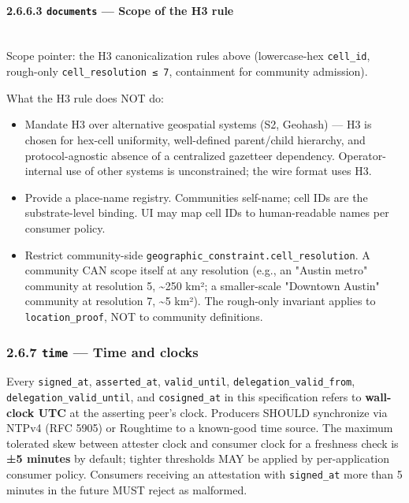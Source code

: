 \documentclass[11pt]{article}
\begin{document}
\paragraph{2.6.6.3 \texttt{documents} — Scope of the H3 rule}\mbox{}\\


Scope pointer: the H3 canonicalization rules above (lowercase-hex \texttt{cell\_id}, rough-only \texttt{cell\_resolution ≤ 7}, containment for community admission).


What the H3 rule does NOT do:

\begin{itemize}\setlength\itemsep{0pt}
\item Mandate H3 over alternative geospatial systems (S2, Geohash) — H3 is chosen for hex-cell uniformity, well-defined parent/child hierarchy, and protocol-agnostic absence of a centralized gazetteer dependency. Operator-internal use of other systems is unconstrained; the wire format uses H3.
\item Provide a place-name registry. Communities self-name; cell IDs are the substrate-level binding. UI may map cell IDs to human-readable names per consumer policy.
\item Restrict community-side \texttt{geographic\_constraint.cell\_resolution}. A community CAN scope itself at any resolution (e.g., an "Austin metro" community at resolution 5, \textasciitilde{}250 km²; a smaller-scale "Downtown Austin" community at resolution 7, \textasciitilde{}5 km²). The rough-only invariant applies to \texttt{location\_proof}, NOT to community definitions.
\end{itemize}


\subsubsection*{2.6.7 \texttt{time} — Time and clocks}


Every \texttt{signed\_at}, \texttt{asserted\_at}, \texttt{valid\_until}, \texttt{delegation\_valid\_from}, \texttt{delegation\_valid\_until}, and \texttt{cosigned\_at} in this specification refers to \textbf{wall-clock UTC} at the asserting peer's clock. Producers SHOULD synchronize via NTPv4 (RFC 5905) or Roughtime to a known-good time source. The maximum tolerated skew between attester clock and consumer clock for a freshness check is \textbf{±5 minutes} by default; tighter thresholds MAY be applied by per-application consumer policy. Consumers receiving an attestation with \texttt{signed\_at} more than 5 minutes in the future MUST reject as malformed.
\end{document}
